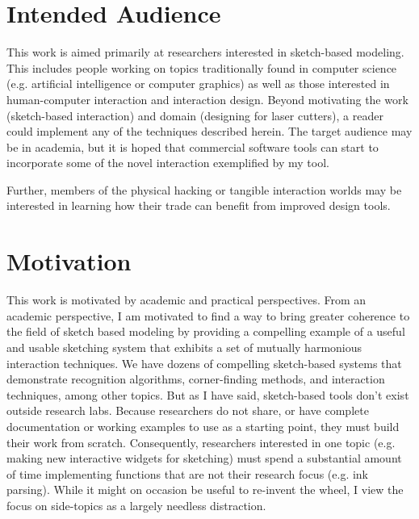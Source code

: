 \section{Intended Audience}

This work is aimed primarily at researchers interested in sketch-based
modeling. This includes people working on topics traditionally found
in computer science (e.g. artificial intelligence or computer
graphics) as well as those interested in human-computer interaction
and interaction design. Beyond motivating the work (sketch-based
interaction) and domain (designing for laser cutters), a reader could
implement any of the techniques described herein. The target audience
may be in academia, but it is hoped that commercial software tools can
start to incorporate some of the novel interaction exemplified by my
tool.

Further, members of the physical hacking or tangible interaction
worlds may be interested in learning how their trade can benefit from
improved design tools.

\section{Motivation}

This work is motivated by academic and practical perspectives. From an
academic perspective, I am motivated to find a way to bring greater
coherence to the field of sketch based modeling by providing a
compelling example of a useful and usable sketching system that
exhibits a set of mutually harmonious interaction techniques. We have
dozens of compelling sketch-based systems that demonstrate recognition
algorithms, corner-finding methods, and interaction techniques, among
other topics. But as I have said, sketch-based tools don't exist
outside research labs. Because researchers do not share, or have
complete documentation or working examples to use as a starting point,
they must build their work from scratch. Consequently, researchers
interested in one topic (e.g. making new interactive widgets for
sketching) must spend a substantial amount of time implementing
functions that are not their research focus (e.g. ink parsing). While
it might on occasion be useful to re-invent the wheel, I view the
focus on side-topics as a largely needless distraction.

